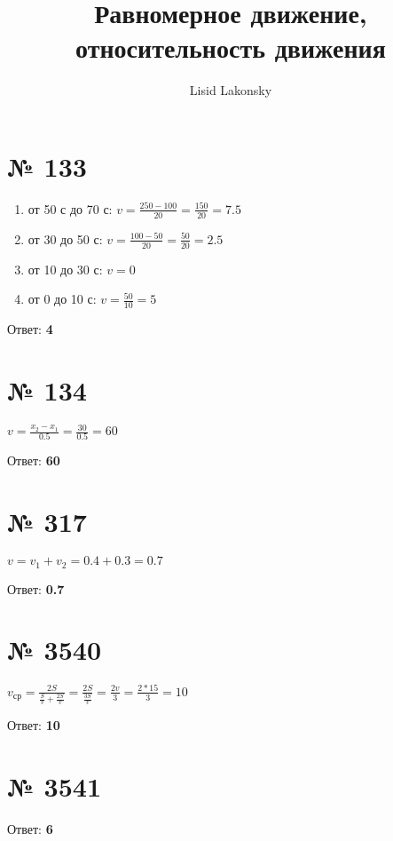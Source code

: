 \documentclass[11pt]{article} %
\title{Равномерное движение, относительность движения}
\author{Lisid Lakonsky}
\begin{document}
\maketitle

\section{№ \textbf{133}}

\begin{enumerate}
	\item от 50 с до 70 с: $v = \frac{250 - 100}{20} = \frac{150}{20} = 7.5$
	\item от 30 до 50 с: $v = \frac{100 - 50}{20} = \frac{50}{20} = 2.5$
	\item от 10 до 30 с: $v = 0$
	\item от 0 до 10 с: $v = \frac{50}{10} = 5$
\end{enumerate}

Ответ: \textbf{4}

\section{№ \textbf{134}}

$ v = \frac{x_2 - x_1}{0.5} = \frac{30}{0.5} = 60 $

Ответ: \textbf{60}

\section{№ \textbf{317}}

$ v = v_1 + v_2  = 0.4 + 0.3 = 0.7 $

Ответ: \textbf{0.7}

\section{№ \textbf{3540}}

$ v_{\text{ср}} = \frac{2S}{\frac{S}{v} + \frac{2S}{v}} = \frac{2S}{\frac{3S}{v}} = \frac{2v}{3} = \frac{2 * 15}{3} = 10 $

Ответ: \textbf{10}

\section{№ \textbf{3541}}

Ответ: \textbf{6}
\end{document}
